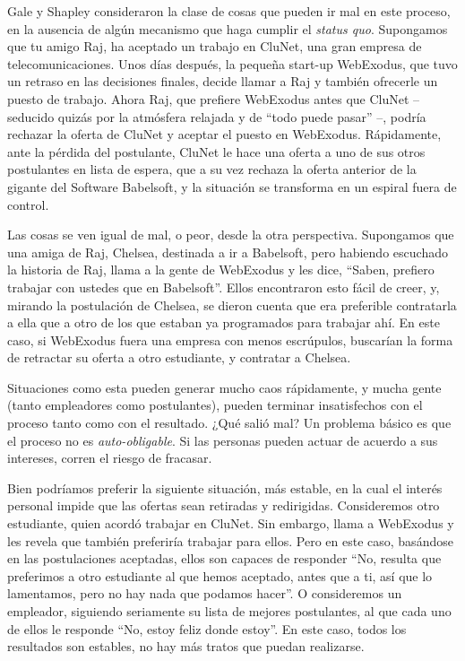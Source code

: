 \documentclass[a4paper, 12pt]{book}
\begin{document}
Gale y Shapley consideraron la clase de cosas que pueden ir mal en este proceso, en la ausencia de algún mecanismo que haga cumplir el \textit{status quo}. Supongamos que tu amigo Raj, ha aceptado un trabajo en CluNet, una gran empresa de telecomunicaciones. Unos días después, la pequeña start-up WebExodus, que tuvo un retraso en las decisiones finales, decide llamar a Raj y también ofrecerle un puesto de trabajo. Ahora Raj, que prefiere WebExodus antes que CluNet -- seducido quizás por la atmósfera relajada y de ``todo puede pasar'' --, podría rechazar la oferta de CluNet y aceptar el puesto en WebExodus. Rápidamente, ante la pérdida del postulante, CluNet le hace una oferta a uno de sus otros postulantes en lista de espera, que a su vez rechaza la oferta anterior de la gigante del Software Babelsoft, y la situación se transforma en un espiral fuera de control.

Las cosas se ven igual de mal, o peor, desde la otra perspectiva. Supongamos que una amiga de Raj, Chelsea, destinada a ir a Babelsoft, pero habiendo escuchado la historia de Raj, llama a la gente de WebExodus y les dice, ``Saben, prefiero trabajar con ustedes que en Babelsoft''. Ellos encontraron esto fácil de creer, y, mirando la postulación de Chelsea, se dieron cuenta que era preferible contratarla a ella que a otro de los que estaban ya programados para trabajar ahí. En este caso, si WebExodus fuera una empresa con menos escrúpulos, buscarían la forma de retractar su oferta a otro estudiante, y contratar a Chelsea.

Situaciones como esta pueden generar mucho caos rápidamente, y mucha gente (tanto empleadores como postulantes), pueden terminar insatisfechos con el proceso tanto como con el resultado. ¿Qué salió mal? Un problema básico es que el proceso no es \textit{auto-obligable}. Si las personas pueden actuar de acuerdo a sus intereses, corren el riesgo de fracasar.

Bien podríamos preferir la siguiente situación, más estable, en la cual el interés personal impide que las ofertas sean retiradas y redirigidas. Consideremos otro estudiante, quien acordó trabajar en CluNet. Sin embargo, llama a WebExodus y les revela que también preferiría trabajar para ellos.	Pero en este caso, basándose en las postulaciones aceptadas, ellos son capaces de responder ``No, resulta que preferimos a otro estudiante al que hemos aceptado, antes que a ti, así que lo lamentamos, pero no hay nada que podamos hacer''. O consideremos un empleador, siguiendo seriamente su lista de mejores postulantes, al que cada uno de ellos le responde ``No, estoy feliz donde estoy''. En este caso, todos los resultados son estables, no hay más tratos que puedan realizarse.
\end{document}
